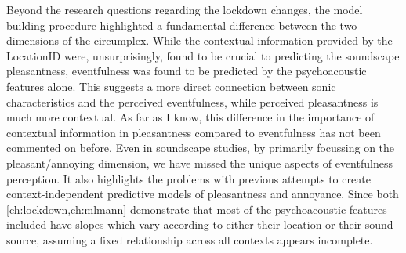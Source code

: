 Beyond the research questions regarding the lockdown changes, the model building procedure highlighted a fundamental difference between the two dimensions of the circumplex. While the contextual information provided by the LocationID were, unsurprisingly, found to be crucial to predicting the soundscape pleasantness, eventfulness was found to be predicted by the psychoacoustic features alone. This suggests a more direct connection between sonic characteristics and the perceived eventfulness, while perceived pleasantness is much more contextual. As far as I know, this difference in the importance of contextual information in pleasantness compared to eventfulness has not been commented on before. Even in soundscape studies, by primarily focussing on the pleasant/annoying dimension, we have missed the unique aspects of eventfulness perception. It also highlights the problems with previous attempts to create context-independent predictive models of pleasantness and annoyance. Since both \cref{ch:lockdown,ch:mlmann} demonstrate that most of the psychoacoustic features included have slopes which vary according to either their location or their sound source, assuming a fixed relationship across all contexts appears incomplete.

